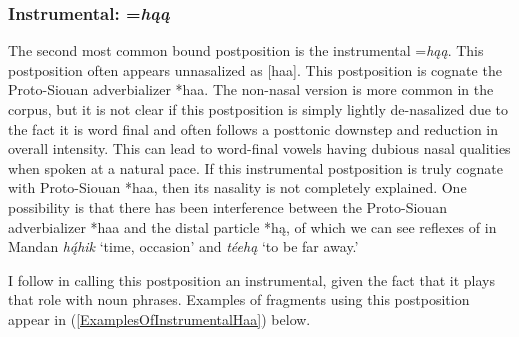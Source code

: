 \subsubsection{Instrumental: =\textit{hąą}}

The second most common bound postposition is the instrumental =\textit{hąą}. This postposition often appears unnasalized as [haa]. This postposition is cognate the Proto-Siouan adverbializer *haa. The non-nasal version is more common in the corpus, but it is not clear if this postposition is simply lightly de-nasalized due to the fact it is word final and often follows a posttonic downstep and reduction in overall intensity. This can lead to word-final vowels having dubious nasal qualities when spoken at a natural pace. If this instrumental postposition is truly cognate with Proto-Siouan *haa, then its nasality is not completely explained. One possibility is that there has been interference between the Proto-Siouan adverbializer *haa and the distal particle *hą, of which we can see reflexes of in Mandan \textit{hą́hik} `time, occasion' and \textit{téehą} `to be far away.'

I follow \citet[25]{kennard1936} in calling this postposition an instrumental, given the fact that it plays that role with noun phrases. Examples of fragments using this postposition appear in (\ref{ExamplesOfInstrumentalHaa}) below.

